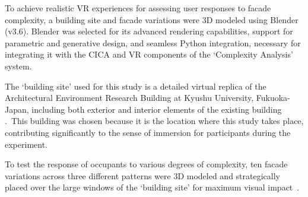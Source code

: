 %    



To achieve realistic VR experiences for assessing user responses to facade complexity, a building site and facade variations were 3D modeled using Blender (v3.6).
Blender was selected for its advanced rendering capabilities, support for parametric and generative design, and seamless Python integration, necessary for integrating it with the CICA and VR components of the `Complexity Analysis' system.

The `building site' used for this study is a detailed virtual replica of the Architectural Environment Research Building at Kyushu University, Fukuoka-Japan, including both exterior and interior elements of the existing building .~This building was chosen because it is the location where this study takes place, contributing significantly to the sense of immersion for participants during the experiment.

To test the response of occupants to various degrees of complexity, ten facade variations across three different patterns were 3D modeled and strategically placed over the large windows of the `building site' for maximum visual impact~.



